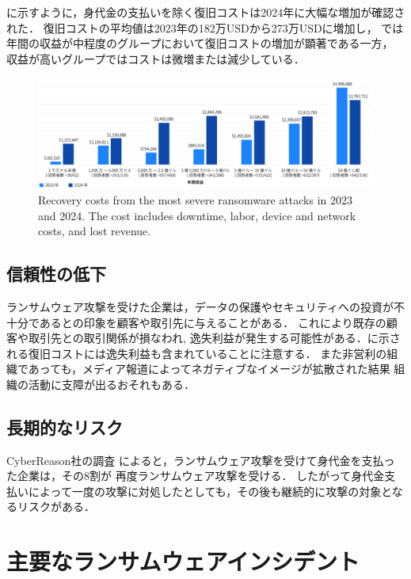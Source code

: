 に示すように，身代金の支払いを除く復旧コストは2024年に大幅な増加が確認された．
復旧コストの平均値は2023年の182万USDから273万USDに増加し\cite{sophos-report:online,spycloud-ransomware}，
では年間の収益が中程度のグループにおいて復旧コストの増加が顕著である一方，
収益が高いグループではコストは微増または減少している．
\begin{figure}[t]
  \begin{center}
    \includegraphics[width=\columnwidth]{doc/img/recovery-cost.eps}
  \end{center}
  \caption{Recovery costs from the most severe ransomware attacks in 2023 and 2024.
    The cost includes downtime, labor, device and network costs, and lost revenue. \cite{sophos-report:online}}
  \label{fig:recovery-cost}
\end{figure}

\subsection{信頼性の低下}
ランサムウェア攻撃を受けた企業は，データの保護やセキュリティへの投資が不十分であるとの印象を顧客や取引先に与えることがある．
これにより既存の顧客や取引先との取引関係が損なわれ,
逸失利益が発生する可能性がある．に示される復旧コストには逸失利益も含まれていることに注意する．
また非営利の組織であっても，メディア報道によってネガティブなイメージが拡散された結果
組織の活動に支障が出るおそれもある．

\subsection{長期的なリスク}
CyberReason社の調査 \cite{cyberreason-report}によると，ランサムウェア攻撃を受けて身代金を支払った企業は，その8割が
再度ランサムウェア攻撃を受ける．
したがって身代金支払いによって一度の攻撃に対処したとしても，その後も継続的に攻撃の対象となるリスクがある．

\section{主要なランサムウェアインシデント}
